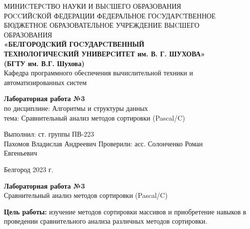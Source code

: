 \documentclass[a4paper,14pt]{extarticle}
\newcommand\textbox[1]{
	\parbox{.45\textwidth}{#1}
}
\begin{document}
\begin{center}
	\small{
		МИНИCТЕРCТВО НАУКИ И ВЫCШЕГО ОБРАЗОВАНИЯ \\РОCCИЙCКОЙ ФЕДЕРАЦИИ
		\bigbreak
		ФЕДЕРАЛЬНОЕ ГОCУДАРCТВЕННОЕ БЮДЖЕТНОЕ ОБРАЗОВАТЕЛЬНОЕ УЧРЕЖДЕНИЕ ВЫCШЕГО ОБРАЗОВАНИЯ \\
		\bigbreak
		\textbf{«БЕЛГОРОДCКИЙ ГОCУДАРCТВЕННЫЙ \\ТЕХНОЛОГИЧЕCКИЙ УНИВЕРCИТЕТ им. В. Г. ШУХОВА»\\ (БГТУ им. В.Г. Шухова)} \\
		\bigbreak
		Кафедра программного обеспечения вычислительной техники и автоматизированных систем\\}
\end{center}

\vfill
\begin{center}
	\large{
		\textbf{
			Лабораторная работа №3}}\\
	\normalsize{
		по дисциплине: Алгоритмы и структуры данных \\
		тема: Сравнительный анализ методов сортировки (Pascal/C)}
\end{center}
\vfill
\hfill\textbox{
	Выполнил: ст. группы ПВ-223\\Пахомов Владислав Андреевич
	\bigbreak
	Проверили: асс. Солонченко Роман\\Евгеньевич
}
\vfill\begin{center}
	Белгород 2023 г.
\end{center}
\newpage
\begin{center}
	\textbf{Лабораторная работа №3}\\
	Сравнительный анализ методов сортировки (Pascal/C)
\end{center}
\textbf{Цель работы: }изучение методов сортировки массивов и приобретение
навыков в проведении сравнительного анализа различных методов сортировки.
\end{document}
